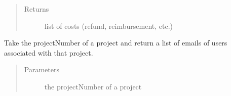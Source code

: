 \documentclass[letterpaper,10pt,english]{sphinxmanual}
\begin{document}
\begin{fulllineitems}
\begin{fulllineitems}
\begin{sphinxVerbatim}[commandchars=\\\{\}]
\PYG{p}{[}
         
         
         
         
          
         
         
\PYG{p}{]}
\end{sphinxVerbatim}
\begin{quote}\begin{description}
\item[{Returns}] \leavevmode
list of costs (refund, reimbursement, etc.)

\end{description}\end{quote}

\end{fulllineitems}


\begin{fulllineitems}
\label{\detokenize{apidoc/utdesign_procurement:utdesign_procurement.apigateway.ApiGateway.getTeamEmails}}
Take the projectNumber of a project and return a list of emails
of users associated with that project.
\begin{quote}\begin{description}
\item[{Parameters}] \leavevmode
{} \textendash{} the projectNumber of a project


\end{description}
\end{quote}
\end{fulllineitems}
\end{fulllineitems}
\end{document}
